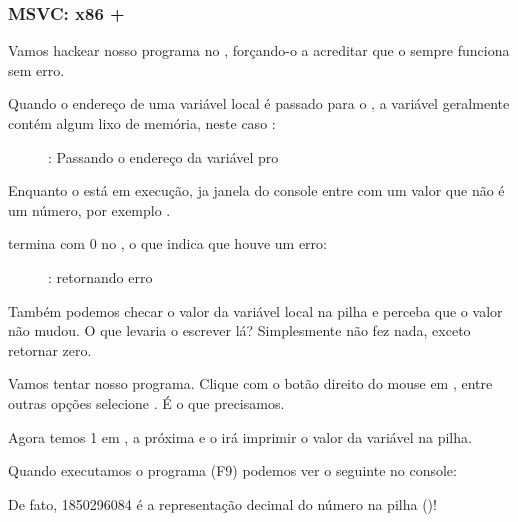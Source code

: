\clearpage
\subsubsection{MSVC: x86 + \olly}

Vamos hackear nosso programa no \olly, forçando-o a acreditar que o \scanf sempre funciona sem erro.

Quando o endereço de uma variável local é passado para o \scanf, a variável geralmente contém algum lixo de memória, neste caso :

\begin{figure}[H]
\centering
{}
\caption{\olly: Passando o endereço da variável pro \scanf}
\label{fig:scanf_ex3_olly_1}
\end{figure}

\clearpage
Enquanto \scanf o está em execução, ja janela do console entre com um valor que não é um número, por exemplo .

\scanf termina com 0 no \EAX,  o que indica que houve um erro:

\begin{figure}[H]
\centering
{}
\caption{\olly: \scanf retornando erro}
\label{fig:scanf_ex3_olly_2}
\end{figure}

Também podemos checar o valor da variável local na pilha e perceba que o valor não mudou.
O que levaria o \scanf escrever lá?
Simplesmente não fez nada, exceto retornar zero.

Vamos tentar  nosso programa.
Clique com o botão direito do mouse em \EAX, entre outras opções selecione . É o que precisamos.

Agora temos 1 em \EAX, a próxima e o \printf irá imprimir o valor da variável na pilha.

Quando executamos o programa (F9) podemos ver o seguinte no console:



De fato, 1850296084 é a representação decimal do número na pilha ()!